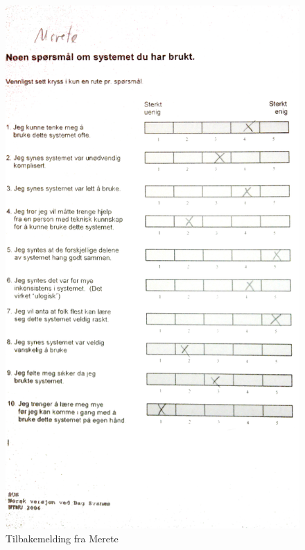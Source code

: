 \begin{figure}[mer]
\centering
\includegraphics[width=140mm]{images/tilbakemelding_merete.jpg}
\caption{Tilbakemelding fra Merete}
\label{overflow}
\end{figure}

